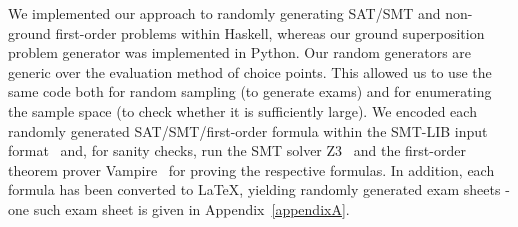 We implemented our approach  to randomly generating
SAT/SMT and non-ground first-order problems within Haskell, whereas
our ground superposition problem generator was implemented in Python. %
Our random generators are generic over the evaluation method of choice points.
This allowed us to use the same code both for random sampling (to generate exams)
and for enumerating the sample space (to check whether it is sufficiently large).
We encoded each randomly generated SAT/SMT/first-order formula within
the SMT-LIB input format~\cite{barrett2017smtlib} and, for sanity checks, run the SMT
solver Z3~\cite{Z3}  and the first-order theorem prover
Vampire~\cite{Vampire13} for proving the respective formulas.
In addition, each formula has been converted  to \LaTeX{}, yielding
randomly generated exam sheets - one such exam sheet is given in
Appendix~\ref{appendixA}. 

%
%
%
%
